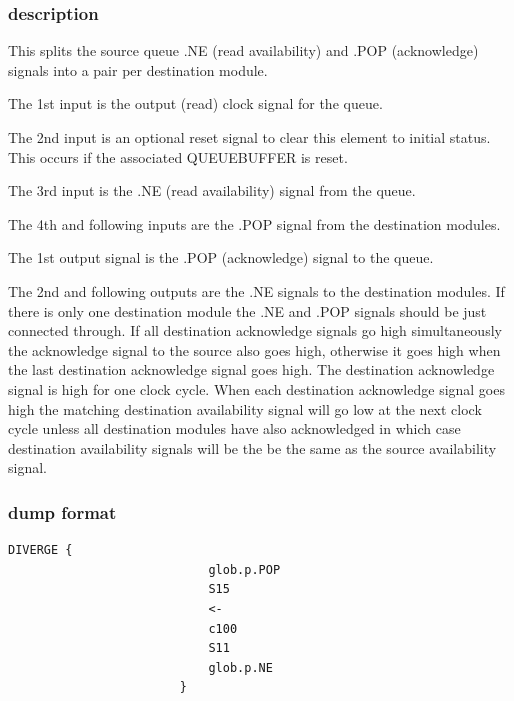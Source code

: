 \documentclass[10pt,a4paper,twoside,fleqn]{book}
\begin{document}
                \subsubsection{description}

                    This splits the source queue .NE (read availability) and
                    .POP (acknowledge) signals into a pair per destination
                    module.

                    The 1st input is the output (read) clock signal for the
                    queue.

                    The 2nd input is an optional reset signal to clear this
                    element to initial status. This occurs if the associated
                    QUEUEBUFFER is reset.

                    The 3rd input is the .NE (read availability) signal from the
                    queue.

                    The 4th and following inputs are the .POP signal from the
                    destination modules.

                    The 1st output signal is the .POP (acknowledge) signal to
                    the queue.               

                    The 2nd and following outputs are the .NE signals to the
                    destination modules. If there is only one destination module
                    the .NE and .POP signals should be just connected through.
                    If all destination acknowledge signals go high
                    simultaneously the acknowledge signal to the source also
                    goes high, otherwise it goes high when the last destination
                    acknowledge signal goes high. The destination acknowledge
                    signal is high for one clock cycle. When each destination
                    acknowledge signal goes high the matching destination
                    availability signal will go low at the next clock cycle
                    unless all destination modules have also acknowledged in
                    which case destination availability signals will be the be
                    the same as the source availability signal.


                \subsubsection{dump format}

                    \begin{lstlisting}[gobble=20, language=tde]
                        DIVERGE {
                            glob.p.POP
                            S15
                            <-
                            c100
                            S11
                            glob.p.NE
                        }
                    \end{lstlisting}
\end{document}
